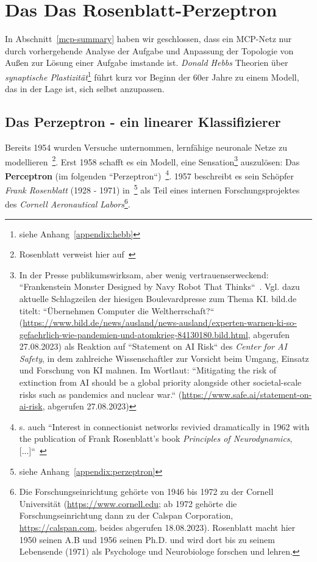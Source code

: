 \section{Das Das Rosenblatt-Perzeptron}

In Abschnitt~\ref{mcp-summary} haben wir geschlossen, dass ein MCP-Netz nur durch vorhergehende Analyse der Aufgabe und Anpassung der Topologie von Außen zur Lösung einer Aufgabe imstande ist.
\textit{Donald Hebbs} Theorien über \textit{synaptische Plastizität}\footnote{
    siehe Anhang~\ref{appendix:hebb}
} führt kurz vor Beginn der 60er Jahre zu einem Modell, das in der Lage ist, sich selbst anzupassen.


\subsection{Das Perzeptron - ein linearer Klassifizierer}

Bereits 1954 wurden Versuche unternommen, lernfähige neuronale Netze zu modellieren~\cite[24]{Ros62}\footnote{
    Rosenblatt verweist hier auf~\cite{FC54}
}.
Erst 1958 schafft es ein Modell, eine Sensation\footnote{
    In der Presse publikumswirksam, aber wenig vertrauenserweckend: ``Frankenstein Monster Designed by Navy Robot That Thinks``~\cite[v]{Ros62}. Vgl. dazu aktuelle Schlagzeilen der hiesigen Boulevardpresse zum Thema KI. bild.de titelt: ``Übernehmen Computer die Weltherrschaft?`` (\url{https://www.bild.de/news/ausland/news-ausland/experten-warnen-ki-so-gefaehrlich-wie-pandemien-und-atomkrieg-84130180.bild.html}, abgerufen 27.08.2023) als Reaktion auf ``Statement on AI Risk`` des \textit{Center for AI Safety}, in dem zahlreiche Wissenschaftler zur Vorsicht beim Umgang, Einsatz und Forschung von KI mahnen. Im Wortlaut: ``Mitigating the risk of extinction from AI should be a global priority alongside other societal-scale risks such as pandemics and nuclear war.`` (\url{https://www.safe.ai/statement-on-ai-risk}, abgerufen 27.08.2023)
} auszulösen: Das \textbf{Perceptron} (im folgenden ``Perzeptron``)~\cite[89]{AR88}\footnote{
    s. auch ``Interest in connectionist networks revivied dramatically in 1962 with the publication of Frank Rosenblatt's book \textit{Principles of Neurodynamics}, [...]``~\cite[xi, Hervorhebung i.O.]{MP88}
}.
1957 beschreibt es sein Schöpfer \textit{Frank Rosenblatt} (1928 - 1971) in~\cite{Ros57}\footnote{
    siehe Anhang~\ref{appendix:perzeptron}
} als Teil eines internen Forschungsprojektes des \textit{Cornell Aeronautical Labors}\footnote{
    Die Forschungseinrichtung gehörte von 1946 bis 1972 zu der Cornell Universität (\url{https://www.cornell.edu}; ab 1972 gehörte die Forschungseinrichtung dann zu der Calspan Corporation, \url{https://calspan.com}, beides abgerufen 18.08.2023). Rosenblatt macht hier 1950 seinen A.B und 1956 seinen Ph.D. und wird dort bis zu seinem Lebensende (1971) als Psychologe und Neurobiologe forschen und lehren.
}.

